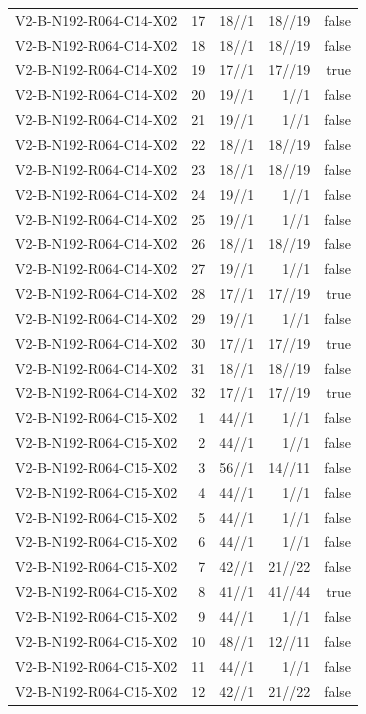 {\begin{longtable}{lrrrr}
V2-B-N192-R064-C14-X02 & 17 & 18//1 & 18//19 & false \\
V2-B-N192-R064-C14-X02 & 18 & 18//1 & 18//19 & false \\
V2-B-N192-R064-C14-X02 & 19 & 17//1 & 17//19 & true \\
V2-B-N192-R064-C14-X02 & 20 & 19//1 & 1//1 & false \\
V2-B-N192-R064-C14-X02 & 21 & 19//1 & 1//1 & false \\
V2-B-N192-R064-C14-X02 & 22 & 18//1 & 18//19 & false \\
V2-B-N192-R064-C14-X02 & 23 & 18//1 & 18//19 & false \\
V2-B-N192-R064-C14-X02 & 24 & 19//1 & 1//1 & false \\
V2-B-N192-R064-C14-X02 & 25 & 19//1 & 1//1 & false \\
V2-B-N192-R064-C14-X02 & 26 & 18//1 & 18//19 & false \\
V2-B-N192-R064-C14-X02 & 27 & 19//1 & 1//1 & false \\
V2-B-N192-R064-C14-X02 & 28 & 17//1 & 17//19 & true \\
V2-B-N192-R064-C14-X02 & 29 & 19//1 & 1//1 & false \\
V2-B-N192-R064-C14-X02 & 30 & 17//1 & 17//19 & true \\
V2-B-N192-R064-C14-X02 & 31 & 18//1 & 18//19 & false \\
V2-B-N192-R064-C14-X02 & 32 & 17//1 & 17//19 & true \\
V2-B-N192-R064-C15-X02 & 1 & 44//1 & 1//1 & false \\
V2-B-N192-R064-C15-X02 & 2 & 44//1 & 1//1 & false \\
V2-B-N192-R064-C15-X02 & 3 & 56//1 & 14//11 & false \\
V2-B-N192-R064-C15-X02 & 4 & 44//1 & 1//1 & false \\
V2-B-N192-R064-C15-X02 & 5 & 44//1 & 1//1 & false \\
V2-B-N192-R064-C15-X02 & 6 & 44//1 & 1//1 & false \\
V2-B-N192-R064-C15-X02 & 7 & 42//1 & 21//22 & false \\
V2-B-N192-R064-C15-X02 & 8 & 41//1 & 41//44 & true \\
V2-B-N192-R064-C15-X02 & 9 & 44//1 & 1//1 & false \\
V2-B-N192-R064-C15-X02 & 10 & 48//1 & 12//11 & false \\
V2-B-N192-R064-C15-X02 & 11 & 44//1 & 1//1 & false \\
V2-B-N192-R064-C15-X02 & 12 & 42//1 & 21//22 & false \\

\end{longtable}}
